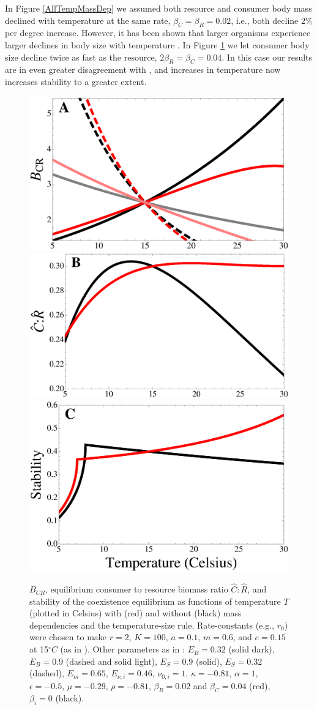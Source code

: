 \documentclass[letter,12pt]{article}
\begin{document}
In Figure \ref{AllTempMassDep} we assumed both resource and consumer body mass declined with temperature at the same rate, $\beta_C = \beta_R = 0.02$, i.e., both decline $2\%$ per degree increase.
However, it has been shown that larger organisms experience larger declines in body size with temperature \cite{Forster2012}.
In Figure \ref{AllTempMassDepAsymm} we let consumer body size decline twice as fast as the resource, $2 \beta_R = \beta_C = 0.04$.
In this case our results are in even greater disagreement with \cite{Gilbert2014}, and increases in temperature now increases stability to a greater extent.

\begin{figure}[!ht]
\centering
\includegraphics[width=0.5\linewidth]{BCRAllTempMassDepAsymm}
\includegraphics[width=0.5\linewidth]{CtoRAllTempMassDepAsymm}
\includegraphics[width=0.5\linewidth]{StabilityAllTempMassDepAsymm}
\caption{
$B_{CR}$, equilibrium consumer to resource biomass ratio $\hat{C}:\hat{R}$, and stability of the coexistence equilibrium as functions of temperature $T$ (plotted in Celsius) with (red) and without (black) mass dependencies and the temperature-size rule.
Rate-constants (e.g., $r_0$) were chosen to make $r = 2$, $K = 100$, $a = 0.1$, $m = 0.6$, and $e = 0.15$ at 15$^\circ C$ (as in \cite{Gilbert2014}).
Other parameters as in \cite{Gilbert2014,DeLong2015}: $E_B = 0.32$ (solid dark), $E_B = 0.9$ (dashed and solid light), $E_S = 0.9$ (solid), $E_S = 0.32$ (dashed), $E_m = 0.65$, $E_{\nu,i} = 0.46$, $\nu_{0,i} = 1$, $\kappa = -0.81$, $\alpha = 1$, $\epsilon = -0.5$, $\mu = -0.29$, $\rho = -0.81$, $\beta_R = 0.02$ and $\beta_C = 0.04$ (red), $\beta_i = 0$ (black).  
}
\label{AllTempMassDepAsymm}
\end{figure}
\end{document}
